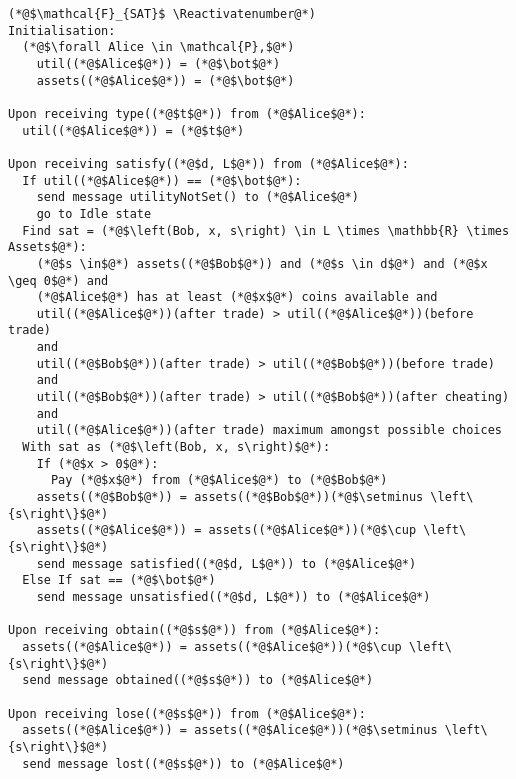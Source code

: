 \Suppressnumber
\begin{lstlisting}[label=satfunc, style=numbers]
(*@$\mathcal{F}_{SAT}$ \Reactivatenumber@*)
Initialisation:
  (*@$\forall Alice \in \mathcal{P},$@*)
    util((*@$Alice$@*)) = (*@$\bot$@*)
    assets((*@$Alice$@*)) = (*@$\bot$@*)

Upon receiving type((*@$t$@*)) from (*@$Alice$@*):
  util((*@$Alice$@*)) = (*@$t$@*)

Upon receiving satisfy((*@$d, L$@*)) from (*@$Alice$@*):
  If util((*@$Alice$@*)) == (*@$\bot$@*):
    send message utilityNotSet() to (*@$Alice$@*)
    go to Idle state
  Find sat = (*@$\left(Bob, x, s\right) \in L \times \mathbb{R} \times Assets$@*):
    (*@$s \in$@*) assets((*@$Bob$@*)) and (*@$s \in d$@*) and (*@$x \geq 0$@*) and
    (*@$Alice$@*) has at least (*@$x$@*) coins available and
    util((*@$Alice$@*))(after trade) > util((*@$Alice$@*))(before trade)
    and
    util((*@$Bob$@*))(after trade) > util((*@$Bob$@*))(before trade)
    and
    util((*@$Bob$@*))(after trade) > util((*@$Bob$@*))(after cheating)
    and
    util((*@$Alice$@*))(after trade) maximum amongst possible choices
  With sat as (*@$\left(Bob, x, s\right)$@*):
    If (*@$x > 0$@*):
      Pay (*@$x$@*) from (*@$Alice$@*) to (*@$Bob$@*)
    assets((*@$Bob$@*)) = assets((*@$Bob$@*))(*@$\setminus \left\{s\right\}$@*)
    assets((*@$Alice$@*)) = assets((*@$Alice$@*))(*@$\cup \left\{s\right\}$@*)
    send message satisfied((*@$d, L$@*)) to (*@$Alice$@*)
  Else If sat == (*@$\bot$@*)
    send message unsatisfied((*@$d, L$@*)) to (*@$Alice$@*)

Upon receiving obtain((*@$s$@*)) from (*@$Alice$@*):
  assets((*@$Alice$@*)) = assets((*@$Alice$@*))(*@$\cup \left\{s\right\}$@*)
  send message obtained((*@$s$@*)) to (*@$Alice$@*)

Upon receiving lose((*@$s$@*)) from (*@$Alice$@*):
  assets((*@$Alice$@*)) = assets((*@$Alice$@*))(*@$\setminus \left\{s\right\}$@*)
  send message lost((*@$s$@*)) to (*@$Alice$@*)
\end{lstlisting}
